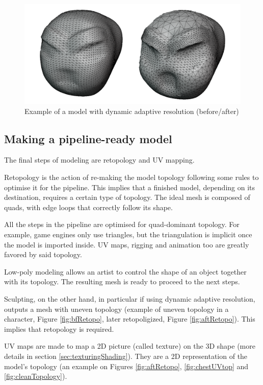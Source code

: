 \documentclass[12pt,twoside]{report}
\begin{document}
\begin{figure}[hp]
    \centering
    \includegraphics[width=56ex]{graphics/dyntopo_bfaft.png}
    \caption[Example of a model with dynamic adaptive resolution]{Example of a model with dynamic adaptive resolution (before/after)}
    \label{fig:dyntopo}
\end{figure}

\subsection{Making a pipeline-ready model}
\label{subsec:pipelineRdyModel}
The final steps of modeling are retopology and UV mapping.

Retopology is the action of re-making the model topology following some rules to optimise it for the pipeline. This implies that a finished model, depending on its destination, requires a certain type of topology. The ideal mesh is composed of quads, with edge loops that correctly follow its shape.

All the steps in the pipeline are optimised for quad-dominant topology. For example, game engines only use triangles, but the triangulation is implicit once the model is imported inside. UV maps, rigging and animation too are greatly favored by said topology.

Low-poly modeling allows an artist to control the shape of an object together with its topology. The resulting mesh is ready to proceed to the next steps.

Sculpting, on the other hand, in particular if using dynamic adaptive resolution, outputs a mesh with uneven topology (example of uneven topology in a character, Figure \ref{fig:bfRetopo}, later retopoligized, Figure \ref{fig:aftRetopo}). This implies that retopology is required.

UV maps are made to map a 2D picture (called texture) on the 3D shape (more details in section \ref{sec:texturingShading}). They are a 2D representation of the model's topology (an example on Figures \ref{fig:aftRetopo}, \ref{fig:chestUVtop} and \ref{fig:cleanTopology}).
\end{document}
